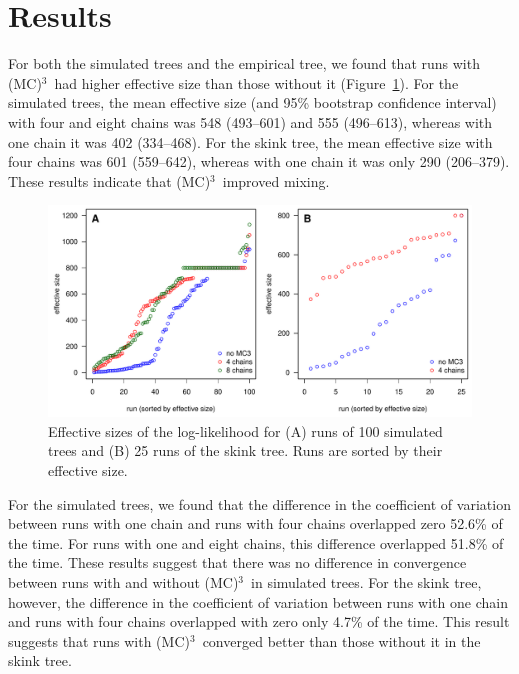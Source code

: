 \documentclass[12pt]{article}
\newcommand{\MCMCMC}{(MC)$^{3}$}
\begin{document}
\section*{Results}

For both the simulated trees and the empirical tree,
we found that runs with \MCMCMC\ had higher effective size
than those without it (Figure~\ref{fig:eff-size}).
%
For the simulated trees,
the mean effective size (and 95\% bootstrap confidence interval)
with four and eight chains was 548 (493--601) and 555 (496--613),
whereas with one chain it was 402 (334--468).
%
For the skink tree,
the mean effective size with four chains was 601 (559--642),
whereas with one chain it was only 290 (206--379).
%
These results indicate that \MCMCMC\ improved mixing.

\begin{figure}
\begin{center}
\includegraphics[width=14cm]{eff-size.pdf}
\end{center}
\caption{Effective sizes of the log-likelihood for
    (A) runs of 100 simulated trees and (B) 25 runs of the skink tree.
    Runs are sorted by their effective size.}
\label{fig:eff-size}
\end{figure}


For the simulated trees,
we found that the difference in the coefficient of variation
between runs with one chain and runs with four chains
overlapped zero 52.6\% of the time.
%
For runs with one and eight chains,
this difference overlapped 51.8\% of the time.
%
These results suggest that there was no difference
in convergence between runs with and without \MCMCMC\ in simulated trees.
%
For the skink tree, however,
the difference in the coefficient of variation
between runs with one chain and runs with four chains
overlapped with zero only 4.7\% of the time.
%
This result suggests that runs with \MCMCMC\ 
converged better than those without it in the skink tree.
\end{document}
